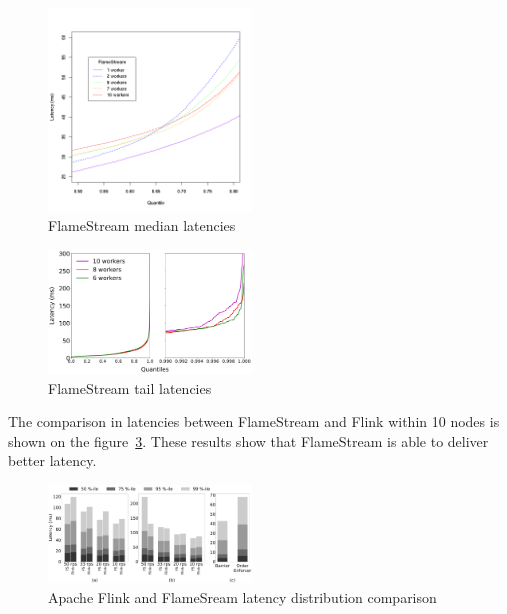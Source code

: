 \begin{figure}[htbp]
  \centering
  \includegraphics[width=0.48\textwidth]{pics/fs-index-median}
  \caption{FlameStream median latencies}
  \label {fs-index-median}
\end{figure}

\begin{figure}[htbp]
  \centering
  \includegraphics[width=0.48\textwidth]{pics/fs-index-quantiles}
  \caption{FlameStream tail latencies}
  \label {fs-index-quantiles}
\end{figure}

The comparison in latencies between FlameStream and Flink within 10 nodes is shown on the figure~\ref{comp-index-quantiles}. These results show that FlameStream is able to deliver better latency.

\begin{figure}[htbp]
  \centering
  \includegraphics[width=0.48\textwidth]{pics/comp-index-quantiles}
  \caption{Apache Flink and FlameSream latency distribution comparison}
  \label {comp-index-quantiles}
\end{figure}
